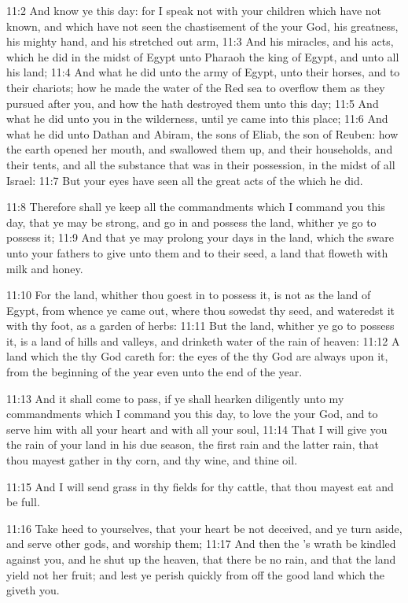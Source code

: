 11:2 And know ye this day: for I speak not with your children which
have not known, and which have not seen the chastisement of the \LORD
your God, his greatness, his mighty hand, and his stretched out arm,
11:3 And his miracles, and his acts, which he did in the midst of
Egypt unto Pharaoh the king of Egypt, and unto all his land; 11:4 And
what he did unto the army of Egypt, unto their horses, and to their
chariots; how he made the water of the Red sea to overflow them as
they pursued after you, and how the \LORD hath destroyed them unto this
day; 11:5 And what he did unto you in the wilderness, until ye came
into this place; 11:6 And what he did unto Dathan and Abiram, the sons
of Eliab, the son of Reuben: how the earth opened her mouth, and
swallowed them up, and their households, and their tents, and all the
substance that was in their possession, in the midst of all Israel:
11:7 But your eyes have seen all the great acts of the \LORD which he
did.

11:8 Therefore shall ye keep all the commandments which I command you
this day, that ye may be strong, and go in and possess the land,
whither ye go to possess it; 11:9 And that ye may prolong your days in
the land, which the \LORD sware unto your fathers to give unto them and
to their seed, a land that floweth with milk and honey.

11:10 For the land, whither thou goest in to possess it, is not as the
land of Egypt, from whence ye came out, where thou sowedst thy seed,
and wateredst it with thy foot, as a garden of herbs: 11:11 But the
land, whither ye go to possess it, is a land of hills and valleys, and
drinketh water of the rain of heaven: 11:12 A land which the \LORD thy
God careth for: the eyes of the \LORD thy God are always upon it, from
the beginning of the year even unto the end of the year.

11:13 And it shall come to pass, if ye shall hearken diligently unto
my commandments which I command you this day, to love the \LORD your
God, and to serve him with all your heart and with all your soul,
11:14 That I will give you the rain of your land in his due season,
the first rain and the latter rain, that thou mayest gather in thy
corn, and thy wine, and thine oil.

11:15 And I will send grass in thy fields for thy cattle, that thou
mayest eat and be full.

11:16 Take heed to yourselves, that your heart be not deceived, and ye
turn aside, and serve other gods, and worship them; 11:17 And then the
\LORD's wrath be kindled against you, and he shut up the heaven, that
there be no rain, and that the land yield not her fruit; and lest ye
perish quickly from off the good land which the \LORD giveth you.

